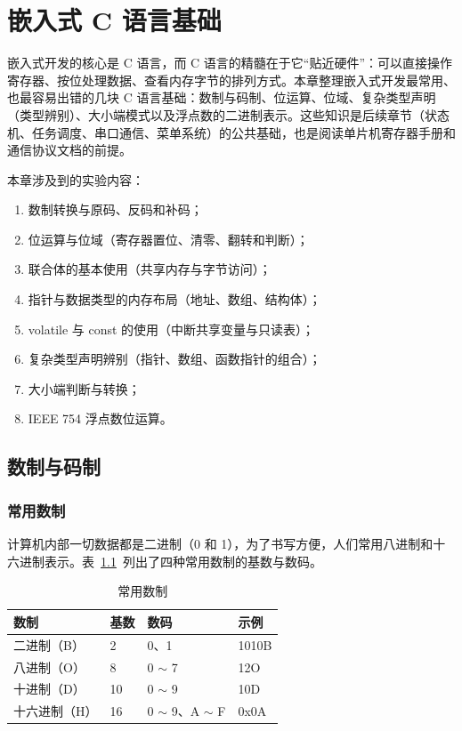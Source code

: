 \chapter{嵌入式 C 语言基础} \label{ch:embedded-c}

嵌入式开发的核心是 C 语言，而 C 语言的精髓在于它“贴近硬件”：可以直接操作寄存器、按位处理数据、查看内存字节的排列方式。本章整理嵌入式开发最常用、也最容易出错的几块 C 语言基础：数制与码制、位运算、位域、复杂类型声明（类型辨别）、大小端模式以及浮点数的二进制表示。这些知识是后续章节（状态机、任务调度、串口通信、菜单系统）的公共基础，也是阅读单片机寄存器手册和通信协议文档的前提。

\medskip 本章涉及到的实验内容：
\begin{enumerate}
\item 数制转换与原码、反码和补码；
\item 位运算与位域（寄存器置位、清零、翻转和判断）；
\item 联合体的基本使用（共享内存与字节访问）；
\item 指针与数据类型的内存布局（地址、数组、结构体）；
\item volatile 与 const 的使用（中断共享变量与只读表）；
\item 复杂类型声明辨别（指针、数组、函数指针的组合）；
\item 大小端判断与转换；
\item IEEE 754 浮点数位运算。
\end{enumerate}

\section{数制与码制}

\subsection{常用数制}

计算机内部一切数据都是二进制（0 和 1），为了书写方便，人们常用八进制和十六进制表示。表~\ref{tab:num-system}~列出了四种常用数制的基数与数码。

\begin{table}[htbp]
\centering \caption{常用数制} \label{tab:num-system}
    \begin{tabular}{llll}
        \toprule
        数制 & 基数 & 数码 & 示例 \\
        \midrule
        二进制（B）    & 2  & 0、1                     & 1010B \\
        八进制（O）    & 8  & 0 $\sim$ 7               & 12O \\
        十进制（D）    & 10 & 0 $\sim$ 9               & 10D \\
        十六进制（H）  & 16 & 0 $\sim$ 9、A $\sim$ F    & 0x0A \\
        \bottomrule
    \end{tabular}
\end{table}

